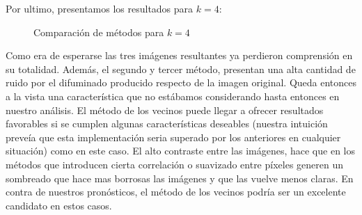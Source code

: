 Por ultimo, presentamos los resultados para $k=4$:

\begin{figure}[H]
    \centering
    \qquad
    \qquad
    \caption{Comparación de métodos para $k = 4$}
    \label{fig:example}
\end{figure}

Como era de esperarse las tres imágenes resultantes ya perdieron comprensión en su totalidad. Además, el segundo y tercer método, presentan una alta cantidad de ruido por el difuminado producido respecto de la imagen original.
Queda entonces a la vista una característica que no estábamos considerando hasta entonces en nuestro análisis. El método de los vecinos puede llegar a ofrecer resultados favorables si se cumplen algunas características deseables (nuestra intuición preveía que esta implementación seria superado por los anteriores en cualquier situación) como en este caso. El alto contraste entre las imágenes, hace que en los métodos que introducen cierta correlación o suavizado entre píxeles generen un sombreado que hace mas borrosas las imágenes y que las vuelve menos claras. En contra de nuestros pronósticos, el método de los vecinos podría ser un excelente candidato en estos casos.



